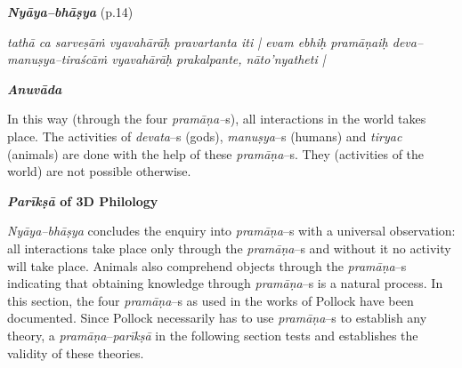 \textit{\textbf{Nyāya–bhāṣya}} (p.14)

\begin{myquote}
\textit{tathā ca sarveṣāṁ vyavahārāḥ pravartanta iti | evam ebhiḥ pramāṇaiḥ deva–manuṣya–tiraścāṁ vyavahārāḥ prakalpante, nāto'nyatheti |}
\end{myquote}

\textit{\textbf{Anuvāda}}

In this way (through the four \textit{pramāṇa–}s), all interactions in the world takes place. The activities of \textit{devata}–s (gods), \textit{manuṣya}–s (humans) and \textit{tiryac} (animals) are done with the help of these \textit{pramāṇa}–s. They (activities of the world) are not possible otherwise.

\textbf{\textit{Parīkṣā} of 3D Philology}

\textit{Nyāya–bhāṣya} concludes the enquiry into\textit{ pramāṇa}–s with a universal observation: all interactions take place only through the \textit{pramāṇa}–s and without it no activity will take place. Animals also comprehend objects through the \textit{pramāṇa}–s indicating that obtaining knowledge through\textit{ pramāṇa}–s is a natural process. In this section, the four \textit{pramāṇa}–s as used in the works of Pollock have been documented. Since Pollock necessarily has to use \textit{pramāṇa}–s to establish any theory, a \textit{pramāṇa}–\textit{parīkṣā} in the following section tests and establishes the validity of these theories.

